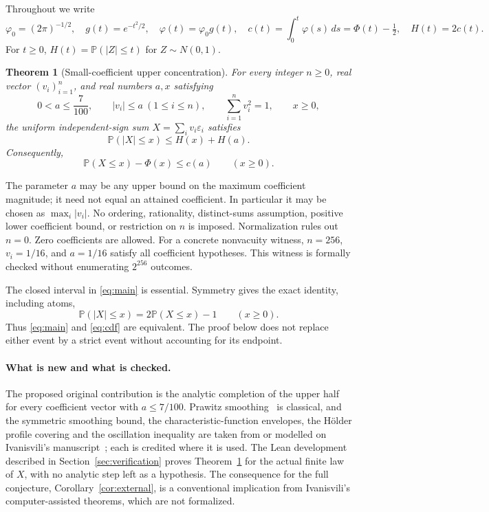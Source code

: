 \documentclass[11pt]{article}
\newtheorem{theorem}{Theorem}[section]
\newcommand{\Pp}{\mathbb P}
\newcommand{\ph}{\varphi}
\newcommand{\phz}{\varphi_0}
\begin{document}
Throughout we write
\[
 \phz=(2\pi)^{-1/2},\quad g(t)=e^{-t^2/2},\quad
 \ph(t)=\phz g(t),\quad c(t)=\int_0^t\ph(s)\,ds=\Phi(t)-\tfrac12,
 \quad H(t)=2c(t).
\]
For $t\ge0$, $H(t)=\Pp(|Z|\le t)$ for $Z\sim N(0,1)$.

\begin{theorem}[Small-coefficient upper concentration]\label{thm:main}
For every integer $n\ge0$, real vector $(v_i)_{i=1}^n$, and real numbers
$a,x$ satisfying
\[
 0<a\le\frac7{100},\qquad |v_i|\le a\ (1\le i\le n),\qquad
 \sum_{i=1}^n v_i^2=1,\qquad x\ge0,
\]
the uniform independent-sign sum $X=\sum_i v_i\varepsilon_i$ satisfies
\begin{equation}\label{eq:main}
 \Pp(|X|\le x)\le H(x)+H(a).
\end{equation}
Consequently,
\begin{equation}\label{eq:cdf}
 \Pp(X\le x)-\Phi(x)\le c(a)\qquad(x\ge0).
\end{equation}
\end{theorem}

The parameter $a$ may be any upper bound on the maximum coefficient magnitude;
it need not equal an attained coefficient. In particular it may be chosen as
$\max_i|v_i|$. No ordering, rationality, distinct-sums assumption, positive
lower coefficient bound, or restriction on $n$ is imposed. Normalization
rules out $n=0$. Zero coefficients are allowed. For a concrete nonvacuity
witness, $n=256$, $v_i=1/16$, and $a=1/16$ satisfy all coefficient hypotheses.
This witness is formally checked without enumerating $2^{256}$ outcomes.

The closed interval in \eqref{eq:main} is essential. Symmetry gives the exact
identity, including atoms,
\[
 \Pp(|X|\le x)=2\Pp(X\le x)-1\qquad(x\ge0).
\]
Thus \eqref{eq:main} and \eqref{eq:cdf} are equivalent. The proof below does
not replace either event by a strict event without accounting for its endpoint.

\paragraph{What is new and what is checked.} The proposed original
contribution is the analytic completion of the upper half for every
coefficient vector with $a\le7/100$. Prawitz smoothing~\cite{P} is
classical, and the symmetric smoothing bound, the characteristic-function
envelopes, the Hölder profile covering and the oscillation inequality are
taken from or modelled on Ivanisvili's manuscript~\cite{I}; each is credited
where it is used. The
Lean development described in Section~\ref{sec:verification} proves
Theorem~\ref{thm:main} for the actual finite law of $X$, with no analytic step
left as a hypothesis. The consequence for the full conjecture,
Corollary~\ref{cor:external}, is a conventional implication from Ivanisvili's
computer-assisted theorems, which are not formalized.
\end{document}

